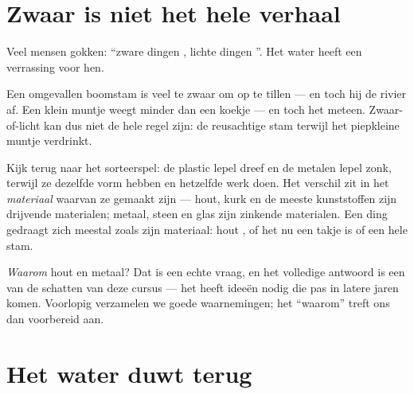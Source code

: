 \section{Zwaar is niet het hele verhaal}

Veel mensen gokken: ``zware dingen , lichte dingen
''. Het water heeft een verrassing voor hen.

\begin{example}\label{ex:g1:floating-and-sinking:log}
Een omgevallen boomstam is veel te zwaar om op te tillen --- en toch
 hij de rivier af. Een klein muntje weegt minder dan een
koekje --- en toch  het meteen. Zwaar-of-licht kan dus niet de
hele regel zijn: de reusachtige stam  terwijl het piepkleine
muntje verdrinkt.
\end{example}

\begin{example}\label{ex:g1:floating-and-sinking:stuff}
Kijk terug naar het sorteerspel: de plastic lepel dreef en de metalen
lepel zonk, terwijl ze dezelfde vorm hebben en hetzelfde werk doen.
Het verschil zit in het \emph{materiaal} waarvan ze gemaakt zijn ---
hout, kurk en de meeste kunststoffen zijn drijvende materialen;
metaal, steen en glas zijn zinkende materialen. Een ding gedraagt zich
meestal zoals zijn materiaal: hout , of het nu een takje is
of een hele stam.
\end{example}

\begin{remark}\label{rem:g1:floating-and-sinking:why}
\emph{Waarom}  hout en  metaal? Dat is een echte vraag, en
het volledige antwoord is een van de schatten van deze cursus --- het
heeft ideeën nodig die pas in latere jaren komen. Voorlopig verzamelen
we goede waarnemingen; het ``waarom'' treft ons dan voorbereid aan.
\end{remark}

\section{Het water duwt terug}

